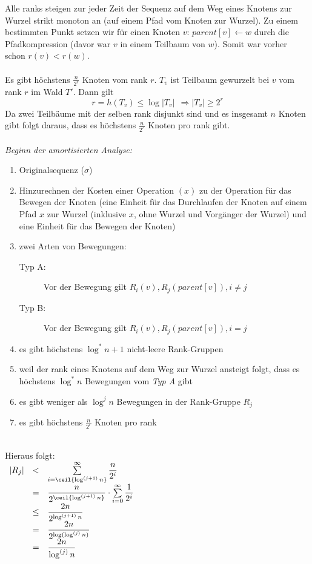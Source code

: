 Alle ranks steigen zur jeder Zeit der Sequenz auf dem Weg eines Knotens zur Wurzel strikt monoton an (auf einem Pfad vom Knoten zur Wurzel).
\vspace*{-0.5\baselineskip}
\Proof
Zu einem bestimmten Punkt setzen wir für einen Knoten $v$: $parent[v] \leftarrow w$ durch die Pfadkompression (davor war $v$ in einem Teilbaum von $w$). Somit war vorher schon $r(v) < r(w)$.\\\\
Es gibt höchstens $\frac{n}{2^r}$ Knoten vom rank $r$.
\vspace*{-0.5\baselineskip}
\Proof
$T_v$ ist Teilbaum gewurzelt bei $v$ vom rank $r$ im Wald $T'$. Dann gilt
\[r=h(T_v)\leq \log |T_v|~~\Rightarrow |T_v|\geq 2^r\]
Da zwei Teilbäume mit der selben rank disjunkt sind und es insgesamt $n$ Knoten gibt folgt daraus, dass es höchstens $\frac{n}{2^r}$ Knoten pro rank gibt.\\\\
\emph{Beginn der amortisierten Analyse:}
\begin{enumerate}
	\item Originalsequenz ($\sigma$)
	\item Hinzurechnen der Kosten einer Operation \find$(x)$ zu der Operation für das Bewegen der Knoten (eine Einheit für das Durchlaufen der Knoten auf einem Pfad $x$ zur Wurzel (inklusive $x$, ohne Wurzel und Vorgänger der Wurzel) und eine Einheit für das Bewegen der Knoten)
	\item zwei Arten von Bewegungen:
		\begin{description}
			\item[Typ A:] Vor der Bewegung gilt $R_i(v), R_j(parent[v]), i\neq j$
			\item[Typ B:] Vor der Bewegung gilt $R_i(v), R_j(parent[v]), i=j$
		\end{description}
	\item es gibt höchstens $\log^{*} n+1$ nicht-leere Rank-Gruppen
	\item weil der rank eines Knotens auf dem Weg zur Wurzel ansteigt folgt, dass es höchstens $\log^{*}n$ Bewegungen vom \emph{Typ A} gibt
	\item es gibt weniger als $\log^{j}n$ Bewegungen in der Rank-Gruppe $R_j$
	\item es gibt höchstens $\frac{n}{2^r}$ Knoten pro rank
\end{enumerate}
\topbreak
\up\ \\Hieraus folgt:\\
$\begin{array}{lcl}
	|R_j| & < &\sum\limits_{i=\ceil{\log^{(j+1)} n}}^{\infty}\dfrac{n}{2^i}\\
	& = & \dfrac{n}{2^{\ceil{\log^{(j+1)} n}}} \cdot \sum\limits_{i=0}^{\infty}\dfrac{1}{2^i}\\
	& \leq & \dfrac{2n}{2^{\log^{(j+1)} n}}\\
	& = & \dfrac{2n}{2^{\log(\log^{(j)} n)}}\\
	& = & \dfrac{2n}{\log^{(j)} n}
\end{array}$\\
